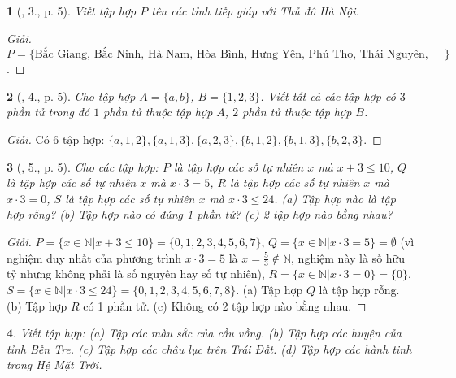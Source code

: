 \documentclass{article}
\newtheorem{baitoan}{}
\begin{document}
\begin{baitoan}[\cite{Tuyen_Toan_6}, 3., p. 5]
	Viết tập hợp $P$ tên các tỉnh tiếp giáp với Thủ đô Hà Nội.
\end{baitoan}

\begin{proof}[Giải]
	$P = \{\mbox{Bắc Giang, Bắc Ninh, Hà Nam, Hòa Bình, Hưng Yên, Phú Thọ, Thái Nguyên, Vĩnh Phúc}\}$.
\end{proof}

\begin{baitoan}[\cite{Tuyen_Toan_6}, 4., p. 5]
	Cho tập hợp $A = \{a,b\}$, $B = \{1,2,3\}$. Viết tất cả các tập hợp có $3$ phần tử trong đó $1$ phần tử thuộc tập hợp $A$, $2$ phần tử thuộc tập hợp $B$.
\end{baitoan}

\begin{proof}[Giải]
	Có 6 tập hợp: $\{a,1,2\},\{a,1,3\},\{a,2,3\},\{b,1,2\},\{b,1,3\},\{b,2,3\}$.
\end{proof}

\begin{baitoan}[\cite{Tuyen_Toan_6}, 5., p. 5]
	Cho các tập hợp: $P$ là tập hợp các số tự nhiên $x$ mà $x + 3\le10$, $Q$ là tập hợp các số tự nhiên $x$ mà $x\cdot3 = 5$, $R$ là tập hợp các số tự nhiên $x$ mà $x\cdot3 = 0$, $S$ là tập hợp các số tự nhiên $x$ mà $x\cdot3\le24$. (a) Tập hợp nào là tập hợp rỗng? (b) Tập hợp nào có đúng 1 phần tử? (c) 2 tập hợp nào bằng nhau?
\end{baitoan}

\begin{proof}[Giải]
	$P = \{x\in\mathbb{N}|x + 3\le10\} = \{0,1,2,3,4,5,6,7\}$, $Q = \{x\in\mathbb{N}|x\cdot3 = 5\} = \emptyset$ (vì nghiệm duy nhất của phương trình $x\cdot3 = 5$ là $x = \frac{5}{3}\notin\mathbb{N}$, nghiệm này là số hữu tỷ nhưng không phải là số nguyên hay số tự nhiên), $R = \{x\in\mathbb{N}|x\cdot3 = 0\} = \{0\}$, $S = \{x\in\mathbb{N}|x\cdot3\le24\} = \{0,1,2,3,4,5,6,7,8\}$. (a) Tập hợp $Q$ là tập hợp rỗng. (b) Tập hợp $R$ có 1 phần tử. (c) Không có 2 tập hợp nào bằng nhau.
\end{proof}

\begin{baitoan}
	Viết tập hợp: (a) Tập các màu sắc của cầu vồng. (b) Tập hợp các huyện của tỉnh Bến Tre. (c) Tập hợp các châu lục trên Trái Đất. (d) Tập hợp các hành tinh trong Hệ Mặt Trời.
\end{baitoan}
\end{document}
